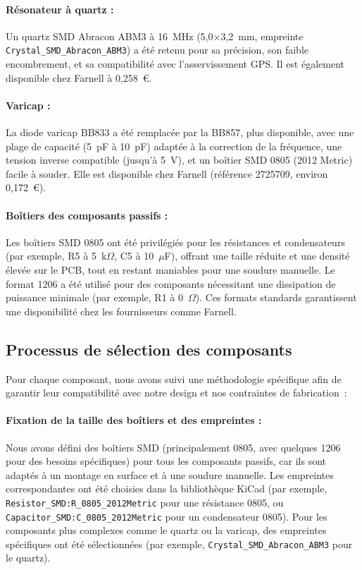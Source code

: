 \documentclass[12pt, a4paper, titlepage]{article}
\begin{document}
\paragraph{Résonateur à quartz :}

Un quartz SMD Abracon ABM3 à 16~MHz (5,0$\times$3,2~mm, empreinte \texttt{Crystal\_SMD\_Abracon\_ABM3}) a été retenu pour sa précision, son faible encombrement, et sa compatibilité avec l’asservissement GPS. Il est également disponible chez Farnell à 0,258~€.

\paragraph{Varicap :}

La diode varicap BB833 a été remplacée par la BB857, plus disponible, avec une plage de capacité (5~pF à 10~pF) adaptée à la correction de la fréquence, une tension inverse compatible (jusqu’à 5~V), et un boîtier SMD 0805 (2012 Metric) facile à souder. Elle est disponible chez Farnell (référence 2725709, environ 0,172~€).

\paragraph{Boîtiers des composants passifs :}

Les boîtiers SMD 0805 ont été privilégiés pour les résistances et condensateurs (par exemple, R5 à 5~k$\Omega$, C5 à 10~$\mu$F), offrant une taille réduite et une densité élevée sur le PCB, tout en restant maniables pour une soudure manuelle. Le format 1206 a été utilisé pour des composants nécessitant une dissipation de puissance minimale (par exemple, R1 à 0~$\Omega$). Ces formats standards garantissent une disponibilité chez les fournisseurs comme Farnell.

\subsection{Processus de sélection des composants}

Pour chaque composant, nous avons suivi une méthodologie spécifique afin de garantir leur compatibilité avec notre design et nos contraintes de fabrication~:

\paragraph{Fixation de la taille des boîtiers et des empreintes :}

Nous avons défini des boîtiers SMD (principalement 0805, avec quelques 1206 pour des besoins spécifiques) pour tous les composants passifs, car ils sont adaptés à un montage en surface et à une soudure manuelle. Les empreintes correspondantes ont été choisies dans la bibliothèque KiCad (par exemple, \texttt{Resistor\_SMD:R\_0805\_2012Metric} pour une résistance 0805, ou \texttt{Capacitor\_SMD:C\_0805\_2012Metric} pour un condensateur 0805). Pour les composants plus complexes comme le quartz ou la varicap, des empreintes spécifiques ont été sélectionnées (par exemple, \texttt{Crystal\_SMD\_Abracon\_ABM3} pour le quartz).
\end{document}
